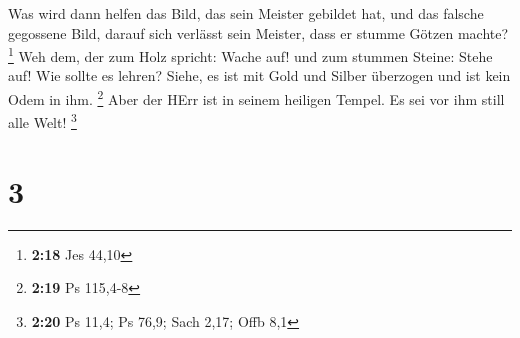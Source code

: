  Was wird dann helfen das Bild, das sein Meister gebildet
hat, und das falsche gegossene Bild, darauf sich verlässt sein Meister,
dass er stumme Götzen machte? \footnote{\textbf{2:18} Jes 44,10}
 Weh dem, der zum Holz spricht: Wache auf! und zum stummen
Steine: Stehe auf! Wie sollte es lehren? Siehe, es ist mit Gold und
Silber überzogen und ist kein Odem in ihm. \footnote{\textbf{2:19} Ps
  115,4-8}  Aber der HErr ist in seinem heiligen Tempel. Es
sei vor ihm still alle Welt! \footnote{\textbf{2:20} Ps 11,4; Ps 76,9;
  Sach 2,17; Offb 8,1}

\hypertarget{section-1}{%
\section{3}\label{section-1}}

